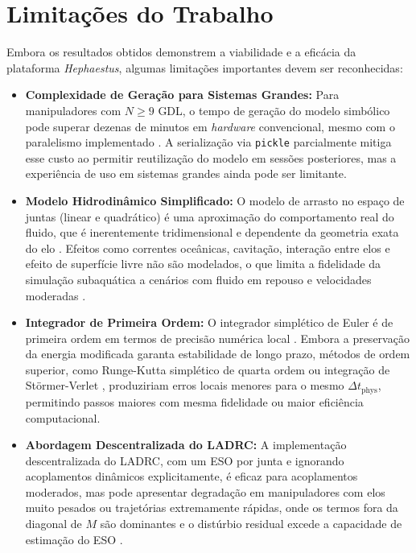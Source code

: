 \section{Limitações do Trabalho}

Embora os resultados obtidos demonstrem a viabilidade e a eficácia da plataforma \textit{Hephaestus}, algumas limitações importantes devem ser reconhecidas:

\begin{itemize}
    \item \textbf{Complexidade de Geração para Sistemas Grandes:} Para manipuladores com $N \geq 9$ GDL, o tempo de geração do modelo simbólico pode superar dezenas de minutos em \textit{hardware} convencional, mesmo com o paralelismo implementado \cite{hollerbach1980recursive, leu1986automated}. A serialização via \texttt{pickle} parcialmente mitiga esse custo ao permitir reutilização do modelo em sessões posteriores, mas a experiência de uso em sistemas grandes ainda pode ser limitante.

    \item \textbf{Modelo Hidrodinâmico Simplificado:} O modelo de arrasto no espaço de juntas (linear e quadrático) é uma aproximação do comportamento real do fluido, que é inerentemente tridimensional e dependente da geometria exata do elo \cite{fossen2011handbook, newman1977marine}. Efeitos como correntes oceânicas, cavitação, interação entre elos e efeito de superfície livre não são modelados, o que limita a fidelidade da simulação subaquática a cenários com fluido em repouso e velocidades moderadas \cite{antonelli2014modelling}.

    \item \textbf{Integrador de Primeira Ordem:} O integrador simplético de Euler é de primeira ordem em termos de precisão numérica local \cite{leimkuhler2004simulating}. Embora a preservação da energia modificada garanta estabilidade de longo prazo, métodos de ordem superior, como Runge-Kutta simplético de quarta ordem ou integração de Störmer-Verlet \cite{hairer2006geometric}, produziriam erros locais menores para o mesmo $\Delta t_{\text{phys}}$, permitindo passos maiores com mesma fidelidade ou maior eficiência computacional.

    \item \textbf{Abordagem Descentralizada do LADRC:} A implementação descentralizada do LADRC, com um ESO por junta e ignorando acoplamentos dinâmicos explicitamente, é eficaz para acoplamentos moderados, mas pode apresentar degradação em manipuladores com elos muito pesados ou trajetórias extremamente rápidas, onde os termos fora da diagonal de $M$ são dominantes e o distúrbio residual excede a capacidade de estimação do ESO \cite{huang2014active, madonski2019general}.


\end{itemize}
